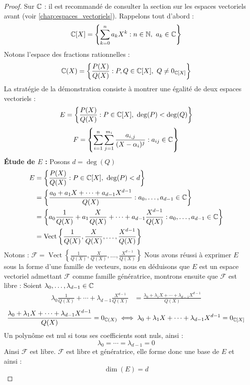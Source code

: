 \begin{proof}\cite{math-sup.fr_decomp}
    Sur $\mathbb{C}$ : il est recommandé de consulter la section sur les espaces vectoriels avant (voir \autoref{chap:espaces_vectoriels}).
    Rappelons tout d'abord :
    \[ \mathbb{C}[X] = \left\{ \sum_{k = 0}^{n} a_k X^k : n \in \mathbb{N},\ a_k \in \mathbb{C} \right\} \]
    Notons l'espace des fractions rationnelles :
    \[ \mathbb{C}(X) = \left\{ \frac{P(X)}{Q(X)} : P, Q \in \mathbb{C}[X],\ Q \neq 0_{\mathbb{C}[X]} \right\} \]
    La stratégie de la démonstration consiste à montrer une égalité de deux espaces vectoriels :
    \[ E = \left\{ \frac{P(X)}{Q(X)} : P \in \mathbb{C}[X],\ \deg(P) < \deg(Q) \right\} \]
    \[ F = \left\{ \sum_{i = 1}^{n} \sum_{j = 1}^{m_i} \frac{a_{i, j}}{(X - \alpha_i)^{j}} : a_{ij} \in \mathbb{C} \right\} \]
    \textbf{\'Etude de $E$ :} Posons $d = \deg(Q)$
    \begin{align*}
        E &= \left\{ \frac{P(X)}{Q(X)} : P \in \mathbb{C}[X],\ \deg(P) < d \right\} \\
          &= \left\{ \frac{a_0 + a_1X + \cdots + a_{d - 1} X^{d - 1}}{Q(X)} : a_0, \ldots, a_{d - 1} \in \mathbb{C} \right\} \\
          &= \left\{ a_0 \frac{1}{Q(X)} + a_1 \frac{X}{Q(X)} + \cdots + a_{d - 1} \frac{X^{d-1}}{Q(X)} : a_0, \ldots, a_{d - 1} \in \mathbb{C} \right\} \\
          &= \operatorname{Vect}\left\{ \frac{1}{Q(X)}, \frac{X}{Q(X)}, \ldots, \frac{X^{d-1}}{Q(X)} \right\}
    \end{align*}
    Notons : $\mathcal{F} = \operatorname{Vect}\left\{ \frac{1}{Q(X)}, \frac{X}{Q(X)}, \ldots, \frac{X^{d-1}}{Q(X)} \right\}$
    Nous avons réussi à exprimer $E$ sous la forme d'une famille de vecteurs, nous en déduisons que $E$ est un espace vectoriel admettant $\mathcal{F}$ comme famille génératrice, montrons ensuite que $\mathcal{F}$ est libre :
    Soient $ \lambda_0,\ldots,\lambda_{d-1} \in \mathbb{C}$
    \begin{align*}
        \lambda_0 \frac{1}{Q(X)} + \cdots + \lambda_{d - 1} \frac{X^{d-1}}{Q(X)} &= \frac{\lambda_0 + \lambda_{1} X + \cdots + \lambda_{d - 1} X^{d - 1}}{Q(X)}
    \end{align*}
    \[ \frac{\lambda_0 + \lambda_{1} X + \cdots + \lambda_{d - 1} X^{d - 1}}{Q(X)} = 0_{\mathbb{C}(X)} \iff \lambda_0 + \lambda_{1} X + \cdots + \lambda_{d - 1} X^{d - 1} = 0_{\mathbb{C}[X]} \]
    Un polynôme est nul si tous ses coefficients sont nuls, ainsi :
    \[ \lambda_0 = \cdots = \lambda_{d-1} = 0 \]
    Ainsi $\mathcal{F}$ est libre. $\mathcal{F}$ est libre et génératrice, elle forme donc une base de $E$ et ainsi : 
    \[ \dim(E) = d \]

\end{proof}
